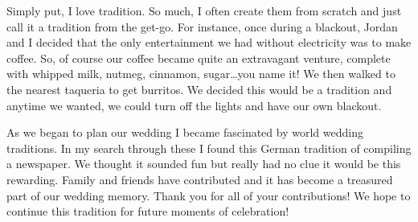 Simply put, I love tradition. So much, I often create them from scratch and
just call it a tradition from the get-go. For instance, once during a blackout,
Jordan and I decided that the only entertainment we had without electricity was
to make coffee. So, of course our coffee became quite an extravagant venture,
complete with whipped milk, nutmeg, cinnamon, sugar\ldots you name it! We then
walked to the nearest taqueria to get burritos. We decided this would be
a tradition and anytime we wanted, we could turn off the lights and have our
own blackout.

As we began to plan our wedding I became fascinated by world wedding
traditions. In my search through these I found this German tradition of
compiling a newspaper. We thought it sounded fun but really had no clue it
would be this rewarding. Family and friends have contributed and it has become
a treasured part of our wedding memory. Thank you for all of your
contributions! We hope to continue this tradition for future moments of
celebration!
